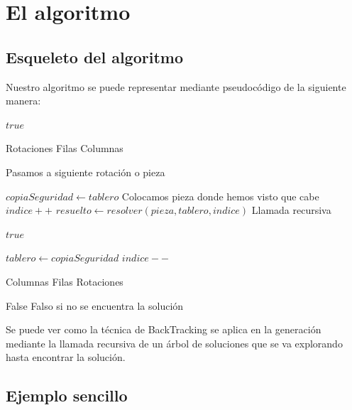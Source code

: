 \documentclass[a4paper, 11pt]{article}
\begin{document}
\section{El algoritmo}

\subsection{Esqueleto del algoritmo}

Nuestro algoritmo se puede representar mediante pseudocódigo de la siguiente manera:

\begin{algorithm}
\begin{algorithmic}
		\State \Return $true$
	\EndIf
	
	 \Comment Rotaciones
         \Comment Filas
        	 \Comment Columnas
        	
        		\State Pasamos a siguiente rotación o pieza
        	\EndIf
        	
        	\State $copiaSeguridad \gets  tablero$
        	\State Colocamos pieza donde hemos visto que cabe
        	\State $indice++$
        	\State $resuelto \gets resolver(pieza,tablero,indice)$ \Comment Llamada recursiva
        	
        		\State \Return $true$
        	
        	\Else
        		\State $tablero \gets copiaSeguridad$
        		\State $indice --$
        	
        	\EndIf
        	
        	
        	
        	\EndFor   \Comment Columnas	
      	\EndFor \Comment Filas
    \EndFor \Comment Rotaciones
	
\State \Return False \Comment Falso si no se encuentra la solución

\EndFunction
\end{algorithmic}
\end{algorithm}

Se puede ver como la técnica de BackTracking se aplica en la generación mediante la llamada recursiva de un árbol de soluciones que se va explorando hasta encontrar la solución.

\subsection{Ejemplo sencillo}
\end{document}
